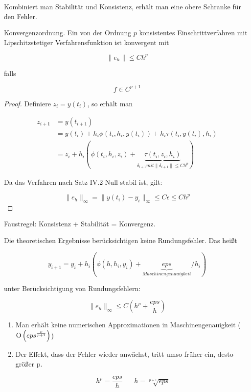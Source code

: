 Kombiniert man Stabilität und Konsistenz, erhält man eine obere Schranke für den Fehler.

\begin{theorem}
	Konvergenzordnung. Ein von der Ordnung $p$ konsistentes Einschrittverfahren mit Lipschitzstetiger Verfahrensfunktion ist konvergent mit
	
	$$\|e_h\| \le Ch^p$$
	
	falls
	
	$$f \in C^{p+1}$$
\end{theorem}

\begin{proof}
	Definiere $z_i = y(t_i)$, so erhält man 
	
	\begin{align*}
		z_{i+1} &= y(t_{i+1}) \\
		&= y(t_i) + h_i \phi(t_i, h_i, y(t_i)) + h_i \tau(t_i, y(t_i), h_i)\\
		&= z_i + h_i(\phi(t_i, h_i, z_i) + \underbrace{\tau(t_i, z_i, h_i)}_{\delta_{i+1} mit \|\delta_{i+1}\| \le Ch^p})
	\end{align*}
	
	Da das Verfahren nach Satz IV.2 Null-stabil ist, gilt:
	
	$$\|e_h\|_\infty = \|y(t_i) - y_i\|_\infty \le C\epsilon \le Ch^p$$
\end{proof}

Faustregel: Konsistenz + Stabilität = Konvergenz.

\begin{remark}
	Die theoretischen Ergebnisse berücksichtigen keine Rundungsfehler. Das heißt
	
	$$y_{i+1} = y_{i} + h_i \left(\phi\left(h, h_i, y_i\right) + \underbrace{eps}_{Maschinengenauigkeit} / h_i \right)$$
	
	unter Berücksichtigung von Rundungsfehlern:
	
	$$\|e_h\|_\infty \le C\left(h^p + \frac{eps}{h}\right)$$
	
	\begin{enumerate}
		\item Man erhält keine numerischen Approximationen in Maschinengenauigkeit ($\operatorname{O}\left(eps^{\frac{p}{p+1}}\right)$)
		\item Der Effekt, dass der Fehler wieder anwächst, tritt umso früher ein, desto größer p.
		
		$$h^p = \frac{eps}{h}\;\;\;\;\;\;h = \sqrt[p+1]{eps}$$
	\end{enumerate}
\end{remark}

